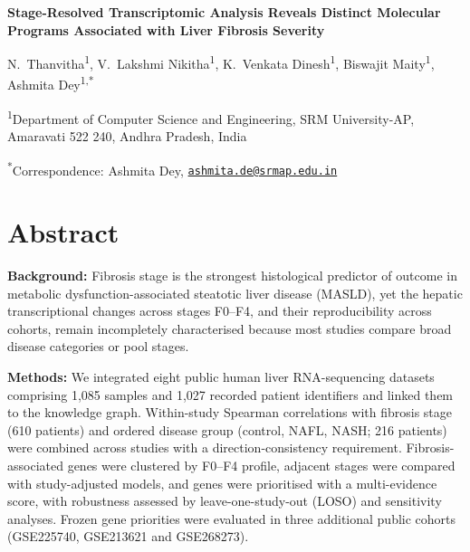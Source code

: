 \documentclass[11pt,a4paper]{article}
\begin{document}
\linenumbers

\begin{center}
{\Large\bfseries Stage-Resolved Transcriptomic Analysis Reveals Distinct Molecular Programs Associated with Liver Fibrosis Severity\par}
\vspace{10pt}
{\normalsize N.~Thanvitha\textsuperscript{1}, V.~Lakshmi Nikitha\textsuperscript{1}, K.~Venkata Dinesh\textsuperscript{1}, Biswajit Maity\textsuperscript{1}, Ashmita Dey\textsuperscript{1,*}\par}
\vspace{4pt}
{\small \textsuperscript{1}Department of Computer Science and Engineering, SRM University-AP, Amaravati 522 240, Andhra Pradesh, India\par
\textsuperscript{*}Correspondence: Ashmita Dey, \href{mailto:ashmita.de@srmap.edu.in}{\nolinkurl{ashmita.de@srmap.edu.in}}\par
}
\end{center}

\section*{Abstract}
\textbf{Background:} Fibrosis stage is the strongest histological predictor of outcome in metabolic dysfunction-associated steatotic liver disease (MASLD), yet the hepatic transcriptional changes across stages F0--F4, and their reproducibility across cohorts, remain incompletely characterised because most studies compare broad disease categories or pool stages.

\textbf{Methods:} We integrated eight public human liver RNA-sequencing datasets comprising 1,085 samples and 1,027 recorded patient identifiers and linked them to the knowledge graph. Within-study Spearman correlations with fibrosis stage (610 patients) and ordered disease group (control, NAFL, NASH; 216 patients) were combined across studies with a direction-consistency requirement. Fibrosis-associated genes were clustered by F0--F4 profile, adjacent stages were compared with study-adjusted models, and genes were prioritised with a multi-evidence score, with robustness assessed by leave-one-study-out (LOSO) and sensitivity analyses. Frozen gene priorities were evaluated in three additional public cohorts (GSE225740, GSE213621 and GSE268273).
\end{document}
